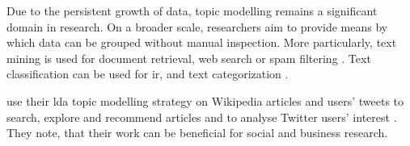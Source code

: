 
Due to the persistent growth of data, topic modelling remains a significant domain in research.
On a broader scale, researchers aim to provide means by which data can be grouped without manual inspection.
More particularly, text mining is used for document retrieval, web search or spam filtering \cite{clusteringDocs2020}.
Text classification can be used for \ac{ir}, and text categorization \cite{tfidf2008}.

\citeauthor{text_mining2016} use their \ac{lda} topic modelling strategy on Wikipedia articles and users' tweets to search, explore and recommend articles and to analyse Twitter users' interest \cite{text_mining2016}.
They note, that their work can be beneficial for social and business research.